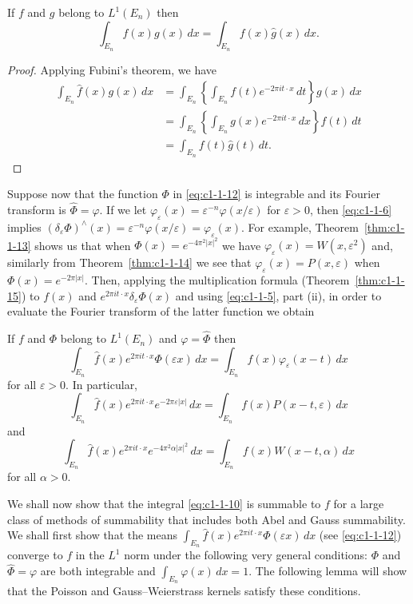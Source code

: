 \begin{theorem}\label{thm:c1-1-15}
If $f$ and $g$ belong to $L^{1}(E_{n})$ then
\[
\int_{E_{n}}\hat{f}(x)g(x)\,dx=\int_{E_{n}}f(x)\hat{g}(x)\,dx.
\]
\end{theorem}

\begin{proof}
Applying Fubini's theorem, we have
\begin{align*}
\int_{E_{n}}\hat{f}(x)g(x)\,dx
&=\int_{E_{n}}\left\{\int_{E_{n}}f(t)e^{-2\pi i t\cdot x}\,dt\right\}g(x)\,dx\\
&=\int_{E_{n}}\left\{\int_{E_{n}}g(x)e^{-2\pi i t\cdot x}\,dx\right\}f(t)\,dt\\
&=\int_{E_{n}}f(t)\hat{g}(t)\,dt.
\end{align*}
\end{proof}

Suppose now that the function $\Phi$ in \eqref{eq:c1-1-12} is integrable and its
Fourier transform is $\hat{\Phi} = \varphi$. If we let
$\varphi_{\varepsilon}(x) = \varepsilon^{-n}\varphi(x/\varepsilon)$ for
$\varepsilon > 0$, then \eqref{eq:c1-1-6} implies
$(\delta_{\varepsilon}\Phi)^{\wedge}(x) = \varepsilon^{-n}\varphi(x/\varepsilon) = \varphi_{\varepsilon}(x)$.
For example, Theorem~\ref{thm:c1-1-13} shows us that when
$\Phi(x) = e^{-4\pi^{2}|x|^{2}}$ we have
$\varphi_{\varepsilon}(x) = W(x, \varepsilon^{2})$ and, similarly from
Theorem~\ref{thm:c1-1-14} we see that $\varphi_{\varepsilon}(x) = P(x, \varepsilon)$
when $\Phi(x) = e^{-2\pi|x|}$. Then, applying the multiplication formula
(Theorem~\ref{thm:c1-1-15}) to $f(x)$ and
$e^{2\pi i t \cdot x} \delta_{\varepsilon}\Phi(x)$ and using \eqref{eq:c1-1-5},
part (ii), in order to evaluate the Fourier transform of the latter function we
obtain

\begin{theorem}\label{thm:c1-1-16}
If $f$ and $\Phi$ belong to $L^{1}(E_{n})$ and $\varphi = \hat{\Phi}$ then
\[
\int_{E_{n}}\hat{f}(x)e^{2\pi i t\cdot x}\Phi(\varepsilon x)\,dx
=\int_{E_{n}}f(x)\varphi_{\varepsilon}(x-t)\,dx
\]
for all $\varepsilon > 0$. In particular,
\[
\int_{E_{n}}\hat{f}(x)e^{2\pi i t\cdot x}e^{-2\pi\varepsilon|x|}\,dx
=\int_{E_{n}}f(x)P(x-t,\varepsilon)\,dx
\]
and
\[
\int_{E_{n}}\hat{f}(x)e^{2\pi i t\cdot x}e^{-4\pi^{2}\alpha|x|^{2}}\,dx
=\int_{E_{n}}f(x)W(x-t,\alpha)\,dx
\]
for all $\alpha > 0$.
\end{theorem}

We shall now show that the integral \eqref{eq:c1-1-10} is summable to $f$ for a
large class of methods of summability that includes both Abel and Gauss
summability. We shall first show that the means
$\int_{E_{n}} \hat{f}(x) e^{2\pi i t \cdot x} \Phi(\varepsilon x) \, dx$
(see \eqref{eq:c1-1-12}) converge to $f$ in the $L^{1}$ norm under the following
very general conditions: $\Phi$ and $\hat{\Phi} = \varphi$ are both integrable
and $\int_{E_{n}} \varphi(x) \, dx = 1$. The following lemma will show that the
Poisson and Gauss--Weierstrass kernels satisfy these conditions.

